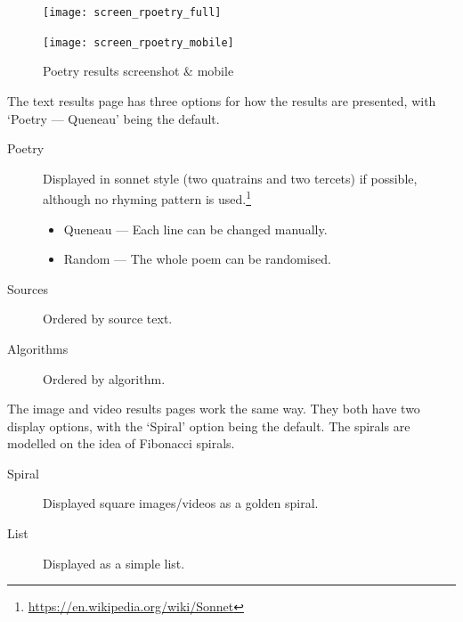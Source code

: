 \begin{figure}[!htbp]
  \centering
  \begin{minipage}{.57\linewidth}
    \texttt{[image: screen\_rpoetry\_full]}
  \end{minipage}
  \hspace{.05\linewidth}
  \begin{minipage}{.27\linewidth}
    \texttt{[image: screen\_rpoetry\_mobile]}
  \end{minipage}
  \caption[screenshots]{Poetry results screenshot \& mobile}
\label{screenshots}
\end{figure}

%

The text results page has three options for how the results are presented, with `Poetry --- Queneau' being the default.
\begin{description}
  \item [Poetry] Displayed in sonnet style (two quatrains and two tercets) if possible, although no rhyming pattern is used.\footnote{\url{https://en.wikipedia.org/wiki/Sonnet}}
    \begin{itemize}
      \item Queneau --- Each line can be changed manually.
      \item Random --- The whole poem can be randomised.
    \end{itemize}
  \item [Sources] Ordered by source text.
  \item [Algorithms] Ordered by algorithm.
\end{description}


The image and video results pages work the same way. They both have two display options, with the `Spiral' option being the default. The spirals are modelled on the idea of Fibonacci spirals.
\begin{description}
  \item [Spiral] Displayed square images/videos as a golden spiral.
  \item [List] Displayed as a simple list.
\end{description}


